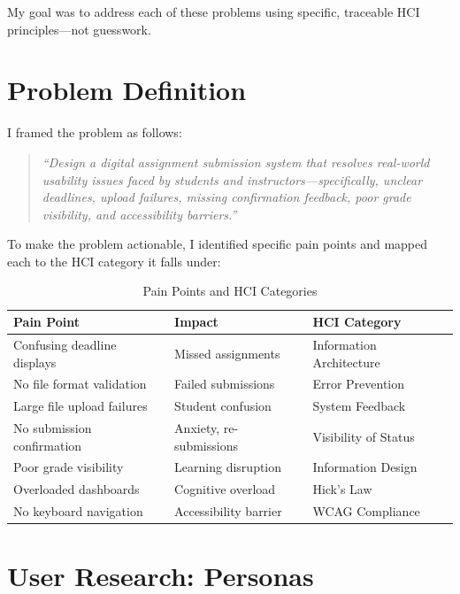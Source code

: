 \documentclass[12pt, a4paper]{article}
\begin{document}
My goal was to address each of these problems using specific, traceable HCI principles—not guesswork.

\section{Problem Definition}

I framed the problem as follows:

\begin{quote}
\textit{``Design a digital assignment submission system that resolves real-world usability issues faced by students and instructors—specifically, unclear deadlines, upload failures, missing confirmation feedback, poor grade visibility, and accessibility barriers.''}
\end{quote}

To make the problem actionable, I identified specific pain points and mapped each to the HCI category it falls under:

\begin{table}[H]
\centering
\caption{Pain Points and HCI Categories}
\begin{tabular}{@{}p{5.5cm}p{3.5cm}p{4cm}@{}}
\toprule
\textbf{Pain Point} & \textbf{Impact} & \textbf{HCI Category} \\
\midrule
Confusing deadline displays & Missed assignments & Information Architecture \\
No file format validation & Failed submissions & Error Prevention \\
Large file upload failures & Student confusion & System Feedback \\
No submission confirmation & Anxiety, re-submissions & Visibility of Status \\
Poor grade visibility & Learning disruption & Information Design \\
Overloaded dashboards & Cognitive overload & Hick's Law \\
No keyboard navigation & Accessibility barrier & WCAG Compliance \\
\bottomrule
\end{tabular}
\end{table}

\section{User Research: Personas}
\end{document}
